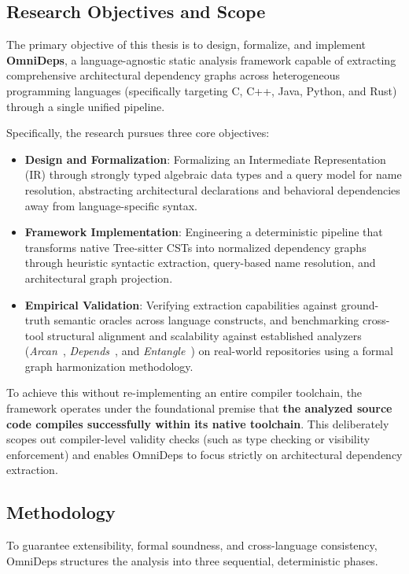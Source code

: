 \documentclass[a4paper, 11pt]{article}
\begin{document}
\subsection{Research Objectives and Scope}
The primary objective of this thesis is to design, formalize, and
implement \textbf{OmniDeps}, a language-agnostic static analysis
framework capable of extracting comprehensive architectural dependency
graphs across heterogeneous programming languages (specifically targeting
C, C++, Java, Python, and Rust) through a single unified pipeline.

Specifically, the research pursues three core objectives:
\begin{itemize}[leftmargin=2.0em, noitemsep]
  \item \textbf{Design and Formalization}: Formalizing an
    Intermediate Representation (IR) through strongly typed algebraic data
    types \cite{pierce_types_2002} and a query model for name
    resolution, abstracting architectural declarations and behavioral
    dependencies away from language-specific syntax.
  \item \textbf{Framework Implementation}: Engineering a
    deterministic pipeline that transforms native Tree-sitter CSTs
    into normalized dependency graphs through heuristic syntactic
    extraction, query-based name resolution, and architectural graph projection.
  \item \textbf{Empirical Validation}: Verifying extraction
    capabilities against ground-truth semantic oracles across
    language constructs, and benchmarking cross-tool structural
    alignment and scalability against established analyzers
    (\textit{Arcan}~\cite{fontana_arcan_2017},
      \textit{Depends}~\cite{depends_github}, and
    \textit{Entangle}~\cite{teruzzi_2024}) on real-world repositories
    using a formal graph harmonization methodology.
\end{itemize}

To achieve this without re-implementing an entire compiler toolchain,
the framework operates under the foundational premise that \textbf{the
  analyzed source code compiles successfully within its native
toolchain}.
This deliberately scopes out compiler-level validity checks (such as
type checking or visibility enforcement) and enables OmniDeps to focus
strictly on architectural dependency extraction.

\subsection{Methodology}
To guarantee extensibility, formal soundness, and cross-language
consistency, OmniDeps structures the analysis into three sequential,
deterministic phases.
\end{document}
